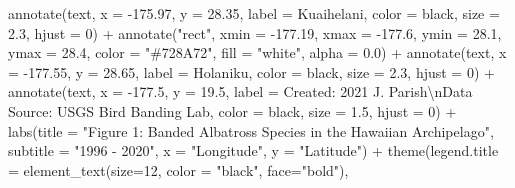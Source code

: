 \documentclass[
]{article}
\newenvironment{Shaded}{\begin{snugshade}}{\end{snugshade}}
\newcommand{\AttributeTok}[1]{\textcolor[rgb]{0.77,0.63,0.00}{#1}}
\newcommand{\DecValTok}[1]{\textcolor[rgb]{0.00,0.00,0.81}{#1}}
\newcommand{\FloatTok}[1]{\textcolor[rgb]{0.00,0.00,0.81}{#1}}
\newcommand{\FunctionTok}[1]{\textcolor[rgb]{0.00,0.00,0.00}{#1}}
\newcommand{\NormalTok}[1]{#1}
\newcommand{\SpecialCharTok}[1]{\textcolor[rgb]{0.00,0.00,0.00}{#1}}
\newcommand{\StringTok}[1]{\textcolor[rgb]{0.31,0.60,0.02}{#1}}
\begin{document}
\begin{Shaded}
\begin{Highlighting}[]
  \FunctionTok{annotate}\NormalTok{(}\StringTok{\textquotesingle{}text\textquotesingle{}}\NormalTok{, }\AttributeTok{x =} \SpecialCharTok{{-}}\FloatTok{175.97}\NormalTok{, }\AttributeTok{y =} \FloatTok{28.35}\NormalTok{, }
           \AttributeTok{label =} \StringTok{\textquotesingle{}Kuaihelani\textquotesingle{}}\NormalTok{, }\AttributeTok{color =} \StringTok{\textquotesingle{}black\textquotesingle{}}\NormalTok{, }\AttributeTok{size =} \FloatTok{2.3}\NormalTok{, }\AttributeTok{hjust =} \DecValTok{0}\NormalTok{) }\SpecialCharTok{+}
  \FunctionTok{annotate}\NormalTok{(}\StringTok{"rect"}\NormalTok{, }\AttributeTok{xmin =} \SpecialCharTok{{-}}\FloatTok{177.19}\NormalTok{, }\AttributeTok{xmax =} \SpecialCharTok{{-}}\FloatTok{177.6}\NormalTok{, }\AttributeTok{ymin =} \FloatTok{28.1}\NormalTok{, }\AttributeTok{ymax =} \FloatTok{28.4}\NormalTok{, }
           \AttributeTok{color =} \StringTok{"\#728A72"}\NormalTok{, }\AttributeTok{fill =} \StringTok{"white"}\NormalTok{, }\AttributeTok{alpha =} \FloatTok{0.0}\NormalTok{) }\SpecialCharTok{+}
  \FunctionTok{annotate}\NormalTok{(}\StringTok{\textquotesingle{}text\textquotesingle{}}\NormalTok{, }\AttributeTok{x =} \SpecialCharTok{{-}}\FloatTok{177.55}\NormalTok{, }\AttributeTok{y =} \FloatTok{28.65}\NormalTok{, }
           \AttributeTok{label =} \StringTok{\textquotesingle{}Holaniku\textquotesingle{}}\NormalTok{, }\AttributeTok{color =} \StringTok{\textquotesingle{}black\textquotesingle{}}\NormalTok{, }\AttributeTok{size =} \FloatTok{2.3}\NormalTok{, }\AttributeTok{hjust =} \DecValTok{0}\NormalTok{) }\SpecialCharTok{+}
  \FunctionTok{annotate}\NormalTok{(}\StringTok{\textquotesingle{}text\textquotesingle{}}\NormalTok{, }\AttributeTok{x =} \SpecialCharTok{{-}}\FloatTok{177.5}\NormalTok{, }\AttributeTok{y =} \FloatTok{19.5}\NormalTok{, }
           \AttributeTok{label =} \StringTok{\textquotesingle{}Created: 2021 J. Parish}\SpecialCharTok{\textbackslash{}n}\StringTok{Data Source: USGS Bird Banding Lab\textquotesingle{}}\NormalTok{, }
           \AttributeTok{color =} \StringTok{\textquotesingle{}black\textquotesingle{}}\NormalTok{, }\AttributeTok{size =} \FloatTok{1.5}\NormalTok{, }\AttributeTok{hjust =} \DecValTok{0}\NormalTok{) }\SpecialCharTok{+}
  \FunctionTok{labs}\NormalTok{(}\AttributeTok{title =} \StringTok{"Figure 1: Banded Albatross Species in the Hawaiian Archipelago"}\NormalTok{,}
        \AttributeTok{subtitle =} \StringTok{"1996 {-} 2020"}\NormalTok{,}
        \AttributeTok{x =} \StringTok{"Longitude"}\NormalTok{,}
        \AttributeTok{y =} \StringTok{"Latitude"}\NormalTok{) }\SpecialCharTok{+}
  \FunctionTok{theme}\NormalTok{(}\AttributeTok{legend.title =} \FunctionTok{element\_text}\NormalTok{(}\AttributeTok{size=}\DecValTok{12}\NormalTok{, }\AttributeTok{color =} \StringTok{"black"}\NormalTok{, }\AttributeTok{face=}\StringTok{"bold"}\NormalTok{),}

\end{Highlighting}
\end{Shaded}
\end{document}
